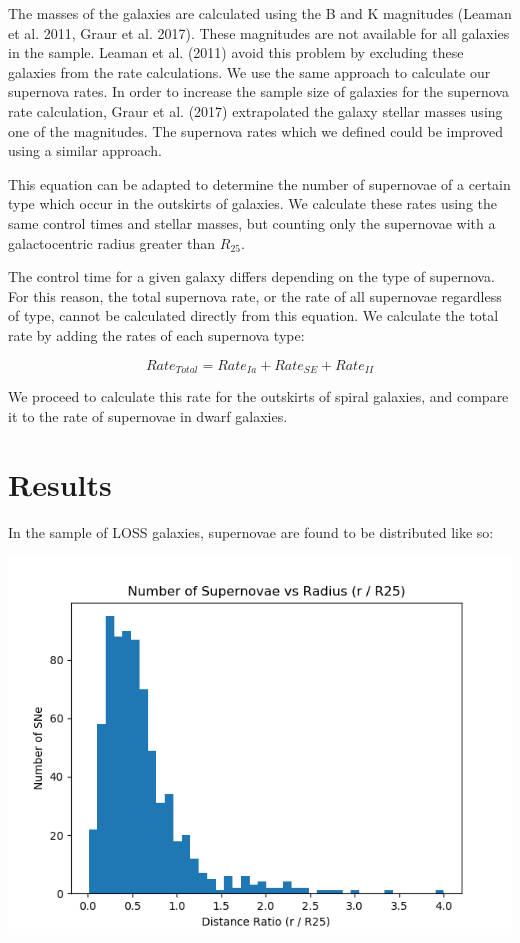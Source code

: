 \documentclass[apj]{emulateapj}
\begin{document}
The masses of the galaxies are calculated using the B and K magnitudes (Leaman et al. 2011, Graur et al. 2017). These magnitudes are not available for all galaxies in the sample. Leaman et al. (2011) avoid this problem by excluding these galaxies from the rate calculations. We use the same approach to calculate our supernova rates. In order to increase the sample size of galaxies for the supernova rate calculation, Graur et al. (2017) extrapolated the galaxy stellar masses using one of the magnitudes. The supernova rates which we defined could be improved using a similar approach.

This equation can be adapted to determine the number of supernovae of a certain type which occur in the outskirts of galaxies. We calculate these rates using the same control times and stellar masses, but counting only the supernovae with a galactocentric radius greater than $R_{25}$.

The control time for a given galaxy differs depending on the type of supernova. For this reason, the total supernova rate, or the rate of all supernovae regardless of type, cannot be calculated directly from this equation. We calculate the total rate by adding the rates of each supernova type:

\begin{equation}
Rate_{Total}=Rate_{Ia}+Rate_{SE}+Rate_{II}
\end{equation}

We proceed to calculate this rate for the outskirts of spiral galaxies, and compare it to the rate of supernovae in dwarf galaxies.

\section{Results}

In the sample of LOSS galaxies, supernovae are found to be distributed like so:

\includegraphics[scale=0.5]{sne_vs_radius}
\end{document}
